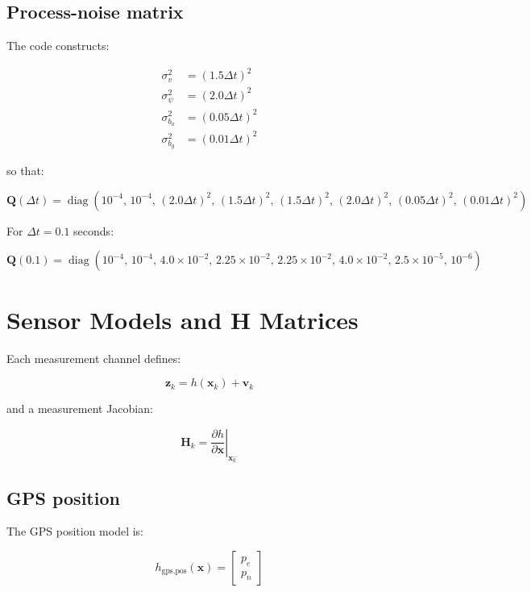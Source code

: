 \documentclass[11pt]{article}
\newcommand{\vect}[1]{\boldsymbol{#1}}
\newcommand{\mat}[1]{\mathbf{#1}}
\newcommand{\diag}{\operatorname{diag}}
\begin{document}
\subsection{Process-noise matrix}

The code constructs:

\begin{align}
\sigma_v^2 &= (1.5\Delta t)^2 \\
\sigma_{\psi}^2 &= (2.0\Delta t)^2 \\
\sigma_{b_a}^2 &= (0.05\Delta t)^2 \\
\sigma_{b_g}^2 &= (0.01\Delta t)^2
\end{align}

so that:

\begin{equation}
\mat{Q}(\Delta t) =
\diag(
10^{-4},\,
10^{-4},\,
(2.0\Delta t)^2,\,
(1.5\Delta t)^2,\,
(1.5\Delta t)^2,\,
(2.0\Delta t)^2,\,
(0.05\Delta t)^2,\,
(0.01\Delta t)^2)
\end{equation}

For $\Delta t = 0.1$ seconds:

\begin{equation}
\mat{Q}(0.1) =
\diag(
10^{-4},\,
10^{-4},\,
4.0\times 10^{-2},\,
2.25\times 10^{-2},\,
2.25\times 10^{-2},\,
4.0\times 10^{-2},\,
2.5\times 10^{-5},\,
10^{-6})
\end{equation}

\section{Sensor Models and H Matrices}

Each measurement channel defines:

\begin{equation}
\vect{z}_k = h(\vect{x}_k) + \vect{v}_k
\end{equation}

and a measurement Jacobian:

\begin{equation}
\mat{H}_k = \left.\frac{\partial h}{\partial \vect{x}}\right|_{\vect{x}_k^-}
\end{equation}

\subsection{GPS position}

The GPS position model is:

\begin{equation}
h_{\text{gps,pos}}(\vect{x}) =
\begin{bmatrix}
p_e \\ p_n
\end{bmatrix}
\end{equation}
\end{document}
